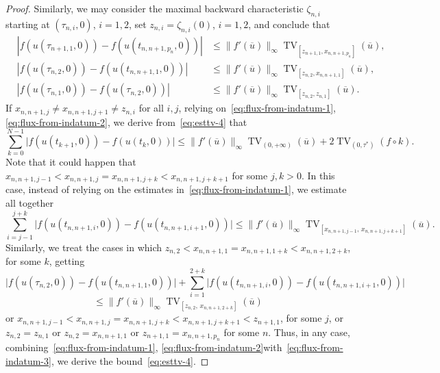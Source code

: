 \documentclass[a4paper, 10pt, final]{article}
\DeclareMathOperator{\tv}{TV}
\begin{document}
\begin{proof}
  Similarly, we may consider the 
  maximal backward characteristic $\zeta_{n,i}$ starting at $(\tau_{n,i}, 0)$, $i=1,2$,
  set $z_{n,i}=\zeta_{n,i}(0)$, $i=1,2$,
  and conclude that
  \begin{eqnarray}
 \nonumber 
      &|f(u(\tau_{n+1,1},0))-f(u(t_{n,n+1, 
      p_n},0))| &\leq \|f'(\overline u)\|_\infty\tv_{[z_{n+1,1}, x_{n,n+1,p_n}]}(\overline u),\\\nonumber 
     & |f(u(\tau_{n,2},0))-f(u(t_{n,n+1, 1},0))|&\leq 
     \|f'(\overline u)\|_\infty\tv_{[z_{n,2}, x_{n,n+1,1}]}(\overline u),\\
      &|f(u(\tau_{n,1},0))-f(u(\tau_{n,2 },0))|&
      \leq \|f'(\overline u)\|_\infty \tv_{[z_{n,2}, z_{n,1}]}(\overline u). \label{eq:flux-from-indatum-2}
  \end{eqnarray}
If $x_{n,n+1,j}\neq x_{n,n+1,j+1}\neq z_{n,i}$ for all $i,j$,  relying on~\eqref{eq:flux-from-indatum-1}, \eqref{eq:flux-from-indatum-2},
  we derive from~\eqref{eq:esttv-4} that
  \begin{equation}
  \label{eq:esttv-5}
      \sum_{k=0}^{N-1}
      \big|f(u(t_{k+1},0))-f(u(t_k,0))\big|
      \leq \|f'(\overline u)\|_\infty\tv_{(0, +\infty)} (\overline{u}) +2\tv_{(0, \tau^*)} (f\circ k).
  \end{equation}
 Note that it could happen that $x_{n,n+1,j-1}<x_{n,n+1,j}=x_{n,n+1,j+k}<x_{n,n+1,j+k+1}$ for some $j, k>0$. In this case, instead of relying on the estimates in~\eqref{eq:flux-from-indatum-1}, we 
 estimate all together 
 \begin{equation}
     \label{eq:flux-from-indatum-3} \sum_{i=j-1}^{j+k}
\big|f(u(t_{n,n+1, i}, 0))-f(u(t_{n,n+1,i+1},0))\big|\leq \big\|f'(\overline u)\big\|_\infty 
 \tv_{[x_{n,n+1,j-1},\, x_{n,n+1,j+k+1}]}(\overline u). 
 \end{equation}
Similarly, we treat the cases in which $z_{n,2}<x_{n,n+1,1}=x_{n,n+1,1+k}<x_{n,n+1,2+k}$, for some  $k$, getting
\[\big|f(u(\tau_{n,2}, 0))-f(u(t_{n,n+1,1},0))\big|+\sum_{i=1}^{2+k}
\big|f(u(t_{n,n+1, i}, 0))-f(u(t_{n,n+1,i+1},0))\big| \]\[\leq   \big\|f'(\overline u)\big\|_\infty 
 \tv_{[z_{n,2},\, x_{n,n+1,2+k}]}(\overline u)
 \]
or $x_{n,n+1,j-1}<x_{n,n+1,j}=x_{n,n+1,j+k}<x_{n,n+1,j+k+1}<z_{n+1,1}$, for some $j$, or 
$z_{n,2}=z_{n,1}$ or $z_{n,2}=x_{n,n+1,1}$ or $z_{n+1,1}=x_{n, n+1, p_n}$ for some $n$.
Thus, in any case,
combining~\eqref{eq:flux-from-indatum-1}, \eqref{eq:flux-from-indatum-2}with~\eqref{eq:flux-from-indatum-3}, we derive the bound~\eqref{eq:esttv-4}.
  \smallskip


\end{proof}
\end{document}
